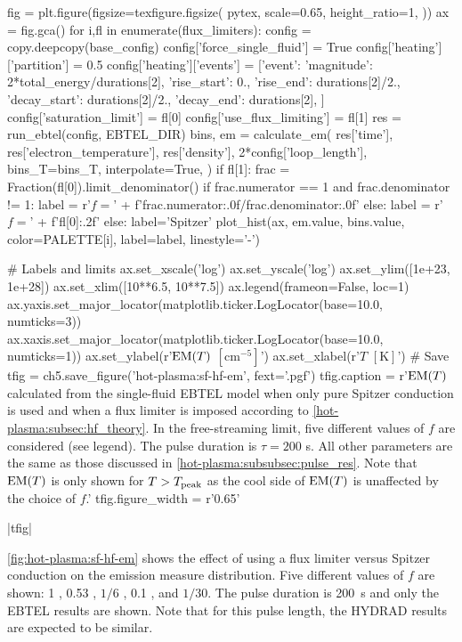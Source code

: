 \begin{pycode}[chapter5]
fig = plt.figure(figsize=texfigure.figsize(
    pytex,
    scale=0.65,
    height_ratio=1,
))
ax = fig.gca()
for i,fl in enumerate(flux_limiters):
    config = copy.deepcopy(base_config)
    config['force_single_fluid'] = True
    config['heating']['partition'] = 0.5
    config['heating']['events'] = [{'event': {
        'magnitude': 2*total_energy/durations[2],
        'rise_start': 0.,
        'rise_end': durations[2]/2.,
        'decay_start': durations[2]/2.,
        'decay_end': durations[2],
    }}]
    config['saturation_limit'] = fl[0]
    config['use_flux_limiting'] = fl[1]
    res = run_ebtel(config, EBTEL_DIR)
    bins, em = calculate_em(
        res['time'],
        res['electron_temperature'],
        res['density'],
        2*config['loop_length'],
        bins_T=bins_T,
        interpolate=True,
    )
    if fl[1]:
        frac = Fraction(fl[0]).limit_denominator()
        if frac.numerator == 1 and frac.denominator != 1:
            label = r'$f=$' + f'{frac.numerator:.0f}/{frac.denominator:.0f}'
        else:
            label = r'$f=$' + f'{fl[0]:.2f}'
    else:
        label='Spitzer'
    plot_hist(ax, em.value, bins.value, color=PALETTE[i], label=label, linestyle='-')

# Labels and limits
ax.set_xscale('log')
ax.set_yscale('log')
ax.set_ylim([1e+23, 1e+28])
ax.set_xlim([10**6.5, 10**7.5])
ax.legend(frameon=False, loc=1)
ax.yaxis.set_major_locator(matplotlib.ticker.LogLocator(base=10.0, numticks=3))
ax.xaxis.set_major_locator(matplotlib.ticker.LogLocator(base=10.0, numticks=1))
ax.set_ylabel(r'$\textup{EM}(T)$ $[\si{\cm\tothe{-5}}]$')
ax.set_xlabel(r'$T$ $[\si{\kelvin}]$')
# Save
tfig = ch5.save_figure('hot-plasma:sf-hf-em', fext='.pgf')
tfig.caption = r'$\emd[T]$ calculated from the single-fluid EBTEL model when only pure Spitzer conduction is used and when a flux limiter is imposed according to \autoref{hot-plasma:subsec:hf_theory}. In the free-streaming limit, five different values of $f$ are considered (see legend). The pulse duration is $\tau=200$ s. All other parameters are the same as those discussed in \autoref{hot-plasma:subsubsec:pulse_res}. Note that $\emd[T]$ is only shown for $T>T_\textup{peak}$ as the cool side of $\emd[T]$ is unaffected by the choice of $f$.'
tfig.figure_width = r'0.65\textwidth'
\end{pycode}
\py[chapter5]|tfig|

\autoref{fig:hot-plasma:sf-hf-em} shows the effect of using a flux limiter versus Spitzer conduction on the emission measure distribution. Five different values of $f$ are shown: 1 \citep[consistent with HYDRAD]{bradshaw_influence_2013}, 0.53 \citep{karpen_nonlocal_1987}, $1/6$ \citep{patsourakos_coronal_2005}, 0.1 \citep{luciani_nonlocal_1983}, and $1/30$. The pulse duration is \SI{200}{\second} and only the EBTEL results are shown. Note that for this pulse length, the HYDRAD results are expected to be similar.

